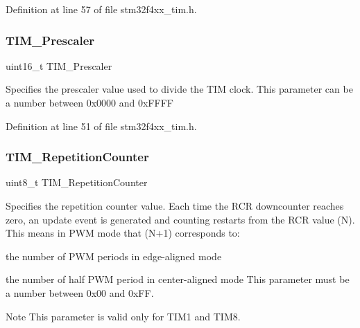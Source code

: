 Definition at line 57 of file stm32f4xx\+\_\+tim.\+h.

\mbox{\label{struct_t_i_m___time_base_init_type_def_a30c6857997a4ddd7d3d66fd3a8907c37}} 
\subsubsection{\texorpdfstring{T\+I\+M\+\_\+\+Prescaler}{TIM\_Prescaler}}
{\footnotesize\ttfamily uint16\+\_\+t T\+I\+M\+\_\+\+Prescaler}

Specifies the prescaler value used to divide the T\+IM clock. This parameter can be a number between 0x0000 and 0x\+F\+F\+FF 

Definition at line 51 of file stm32f4xx\+\_\+tim.\+h.

\mbox{\label{struct_t_i_m___time_base_init_type_def_a121b27ced71ccb2c85f1d9825ae8d496}} 
\subsubsection{\texorpdfstring{T\+I\+M\+\_\+\+Repetition\+Counter}{TIM\_RepetitionCounter}}
{\footnotesize\ttfamily uint8\+\_\+t T\+I\+M\+\_\+\+Repetition\+Counter}

Specifies the repetition counter value. Each time the R\+CR downcounter reaches zero, an update event is generated and counting restarts from the R\+CR value (N). This means in P\+WM mode that (N+1) corresponds to\+:
\begin{DoxyItemize}
\item the number of P\+WM periods in edge-\/aligned mode
\item the number of half P\+WM period in center-\/aligned mode This parameter must be a number between 0x00 and 0x\+FF. \begin{DoxyNote}{Note}
This parameter is valid only for T\+I\+M1 and T\+I\+M8. 
\end{DoxyNote}

\end{DoxyItemize}


